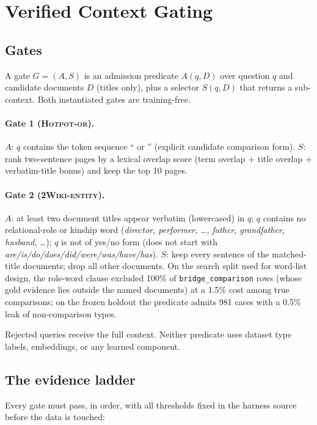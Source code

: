 \documentclass[11pt]{article}
\newcommand{\gateone}{\textsc{Hotpot-or}}
\newcommand{\gatetwo}{\textsc{2Wiki-entity}}
\begin{document}
\section{Verified Context Gating}
\label{sec:method}

\subsection{Gates}

A gate $G=(A,S)$ is an admission predicate $A(q,D)$ over question $q$ and
candidate documents $D$ (titles only), plus a selector $S(q,D)$ that
returns a sub-context. Both instantiated gates are training-free.

\paragraph{Gate 1 (\gateone).} $A$: $q$ contains the token sequence
`` or '' (explicit candidate comparison form). $S$: rank two-sentence pages
by a lexical overlap score (term overlap $+$ title overlap $+$
verbatim-title bonus) and keep the top 10 pages.

\paragraph{Gate 2 (\gatetwo).} $A$: at least two document titles appear
verbatim (lowercased) in $q$; $q$ contains no relational-role or kinship
word (\emph{director, performer, \ldots, father, grandfather, husband,
\ldots}); $q$ is not of yes/no form (does not start with
\emph{are/is/do/does/did/were/was/have/has}). $S$: keep every sentence of
the matched-title documents; drop all other documents. On the search split
used for word-list design, the role-word clause excluded 100\% of
\texttt{bridge\_comparison} rows (whose gold evidence lies outside the
named documents) at a 1.5\% cost among true comparisons; on the frozen
holdout the predicate admits 981 cases with a 0.5\% leak of
non-comparison types.

Rejected queries receive the full context. Neither predicate uses dataset
type labels, embeddings, or any learned component.

\subsection{The evidence ladder}
\label{sec:ladder}

Every gate must pass, in order, with all thresholds fixed in the harness
source before the data is touched:
\end{document}
